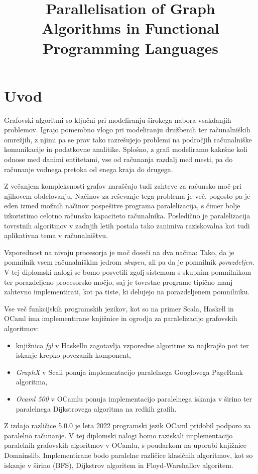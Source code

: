\documentclass[mat1, tisk]{fmfdelo}
\title{Parallelisation of Graph Algorithms in Functional Programming Languages}
\begin{document}
\section{Uvod}

Grafovski algoritmi so ključni pri modeliranju širokega nabora vsakdanjih problemov.
Igrajo pomembno vlogo pri modeliranju družbenih ter računalniških omrežjih, z njimi pa se prav tako razrešujejo 
problemi na področjih računalniške komunikacije in podatkovne analitike. Splošno, z grafi  modeliramo kakršne 
koli odnose med danimi entitetami, vse od računanja razdalj med mesti, pa do računanje vodnega pretoka
od enega kraja do drugega.

Z večanjem kompleksnosti grafov naraščajo tudi zahteve za računsko moč pri njihovem obdelovanju.
Načinov za reševanje tega problema je več, pogosto pa je eden izmed možnih načinov pospešitve programa paralelizacija,
s čimer bolje izkoristimo celotno računsko kapaciteto računalnika. Posledično je paralelizacija tovrstnih algoritmov
v zadnjih letih postala tako zanimiva raziskovalna kot tudi aplikativna tema v računalništvu.

Vzporednost na nivoju procesorja je moč doseči na dva načina: 
Tako, da je pomnilnik vsem računalniškim jedrom \textit{skupen}, ali pa da je pomnilnik \textit{porazdeljen}. 
V tej diplomski nalogi se bomo posvetili zgolj sistemom s skupnim pomnilnikom ter porazdeljeno procesorsko močjo, 
saj je tovrstne programe tipično manj zahtevno implementirati, kot pa tiste, ki delujejo na porazdeljenem pomnilniku.

Vse več funkcijskih programskih jezikov, kot so na primer Scala, Haskell in OCaml ima implementirane knjižnice
in ogrodja za paralelizacijo grafovskih algoritmov:
\begin{itemize}
    \item knjižnica \textit{fgl} v Haskellu \cite{haskell_fgl} zagotavlja vzporedne algoritme za najkrajšo pot 
    ter iskanje krepko povezanih komponent,
    \item \textit{GraphX} v Scali \cite{graphx} ponuja implementacijo paralelnega Googlovega PageRank algoritma,
    \item \textit{Ocaml 500} v OCamlu \cite{ocaml_multicore_500} ponuja implementacijo paralelnega iskanja v širino ter paralelnega Dijkstrovega algoritma na redkih grafih.
\end{itemize}

Z izdajo različice 5.0.0 je leta 2022 programski jezik OCaml pridobil podporo za paralelno računanje.
V tej diplomski nalogi bomo raziskali implementacijo paralelnih grafovskih algoritmov v OCamlu, s
poudarkom na uporabi knjižnice Domainslib. Implementirane bodo paralelne različice klasičnih algoritmov, kot so
iskanje v širino (BFS), Dijkstrov algoritem in Floyd-Warshallov algoritem.
\end{document}
